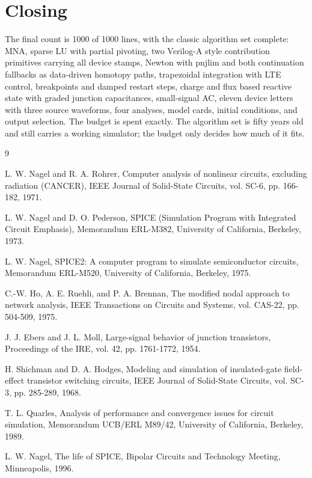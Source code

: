 \documentclass[11pt]{article}
\begin{document}
\section{Closing}

The final count is 1000 of 1000 lines, with the classic algorithm set
complete: MNA, sparse LU with partial pivoting, two Verilog-A style
contribution primitives carrying all device stamps, Newton with pnjlim
and both continuation fallbacks as data-driven homotopy paths,
trapezoidal integration with LTE control, breakpoints and damped restart
steps, charge and flux based reactive state with graded junction
capacitances, small-signal AC, eleven device letters with three source
waveforms, four analyses, model cards, initial conditions, and output
selection. The budget is spent exactly. The algorithm set is fifty years
old and still carries a working simulator; the budget only decides how
much of it fits.

\begin{thebibliography}{9}

 L. W. Nagel and R. A. Rohrer, Computer analysis of
nonlinear circuits, excluding radiation (CANCER), IEEE Journal of
Solid-State Circuits, vol. SC-6, pp. 166-182, 1971.

 L. W. Nagel and D. O. Pederson, SPICE (Simulation
Program with Integrated Circuit Emphasis), Memorandum ERL-M382,
University of California, Berkeley, 1973.

 L. W. Nagel, SPICE2: A computer program to simulate
semiconductor circuits, Memorandum ERL-M520, University of California,
Berkeley, 1975.

 C.-W. Ho, A. E. Ruehli, and P. A. Brennan, The modified
nodal approach to network analysis, IEEE Transactions on Circuits and
Systems, vol. CAS-22, pp. 504-509, 1975.

 J. J. Ebers and J. L. Moll, Large-signal behavior of
junction transistors, Proceedings of the IRE, vol. 42, pp. 1761-1772,
1954.

 H. Shichman and D. A. Hodges, Modeling and simulation
of insulated-gate field-effect transistor switching circuits, IEEE
Journal of Solid-State Circuits, vol. SC-3, pp. 285-289, 1968.

 T. L. Quarles, Analysis of performance and convergence
issues for circuit simulation, Memorandum UCB/ERL M89/42, University of
California, Berkeley, 1989.

 L. W. Nagel, The life of SPICE, Bipolar Circuits
and Technology Meeting, Minneapolis, 1996.

\end{thebibliography}
\end{document}

